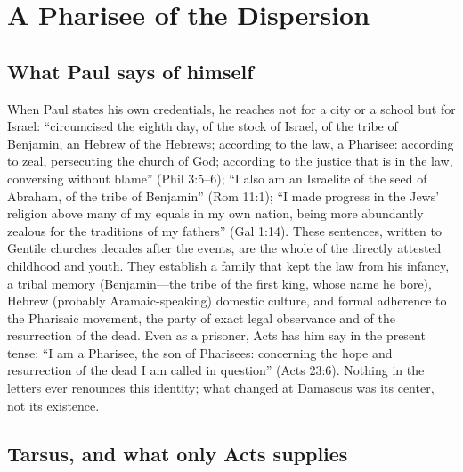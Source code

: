 \section{A Pharisee of the Dispersion}

\subsection{What Paul says of himself}

When Paul states his own credentials, he reaches not for a city or a school
but for Israel: ``circumcised the eighth day, of the stock of Israel, of
the tribe of Benjamin, an Hebrew of the Hebrews; according to the law, a
Pharisee: according to zeal, persecuting the church of God; according to
the justice that is in the law, conversing without blame'' (Phil 3:5--6);
``I also am an Israelite of the seed of Abraham, of the tribe of Benjamin''
(Rom 11:1); ``I made progress in the Jews' religion above many of my
equals in my own nation, being more abundantly zealous for the traditions
of my fathers'' (Gal 1:14). These sentences, written to Gentile churches
decades after the events, are the whole of the directly attested childhood
and youth. They establish a family that kept the law from his infancy, a
tribal memory (Benjamin---the tribe of the first king, whose name he
bore), Hebrew (probably Aramaic-speaking) domestic culture, and formal
adherence to the Pharisaic movement, the party of exact legal observance
and of the resurrection of the dead. Even as a prisoner, Acts has him say
in the present tense: ``I am a Pharisee, the son of Pharisees: concerning
the hope and resurrection of the dead I am called in question'' (Acts
23:6). Nothing in the letters ever renounces this identity; what changed
at Damascus was its center, not its existence.

\subsection{Tarsus, and what only Acts supplies}

